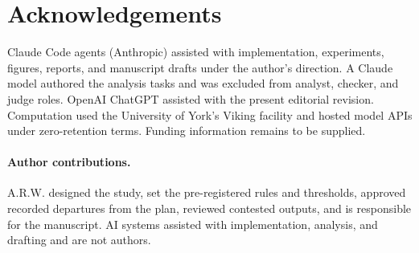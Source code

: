 \section*{Acknowledgements}

Claude Code agents (Anthropic) assisted with implementation, experiments, figures, reports, and manuscript drafts under the author's direction. A Claude model authored the analysis tasks and was excluded from analyst, checker, and judge roles. OpenAI ChatGPT assisted with the present editorial revision. Computation used the University of York's Viking facility and hosted model APIs under zero-retention terms. Funding information remains to be supplied.

\paragraph{Author contributions.}
A.R.W. designed the study, set the pre-registered rules and thresholds, approved recorded departures from the plan, reviewed contested outputs, and is responsible for the manuscript. AI systems assisted with implementation, analysis, and drafting and are not authors.
